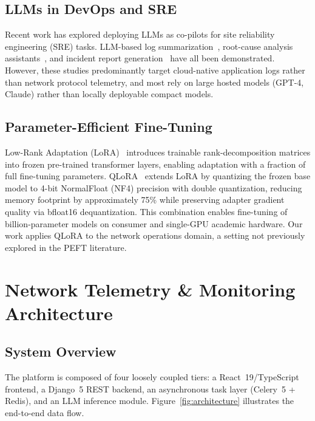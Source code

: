 \documentclass[conference]{IEEEtran}
\begin{document}
\subsection{LLMs in DevOps and SRE}
Recent work has explored deploying LLMs as co-pilots for site reliability engineering (SRE) tasks. LLM-based log summarization~\cite{le2023log}, root-cause analysis assistants~\cite{ahmed2023recommending}, and incident report generation~\cite{chen2023empowering} have all been demonstrated. However, these studies predominantly target cloud-native application logs rather than network protocol telemetry, and most rely on large hosted models (GPT-4, Claude) rather than locally deployable compact models.

\subsection{Parameter-Efficient Fine-Tuning}
Low-Rank Adaptation (LoRA)~\cite{hu2022lora} introduces trainable rank-decomposition matrices into frozen pre-trained transformer layers, enabling adaptation with a fraction of full fine-tuning parameters. QLoRA~\cite{dettmers2023qlora} extends LoRA by quantizing the frozen base model to 4-bit NormalFloat (NF4) precision with double quantization, reducing memory footprint by approximately 75\% while preserving adapter gradient quality via bfloat16 dequantization. This combination enables fine-tuning of billion-parameter models on consumer and single-GPU academic hardware. Our work applies QLoRA to the network operations domain, a setting not previously explored in the PEFT literature.

\section{Network Telemetry \& Monitoring Architecture}
\label{sec:arch}

\subsection{System Overview}

The platform is composed of four loosely coupled tiers: a React~19/TypeScript frontend, a Django~5 REST backend, an asynchronous task layer (Celery~5 + Redis), and an LLM inference module. Figure~\ref{fig:architecture} illustrates the end-to-end data flow.
\end{document}
